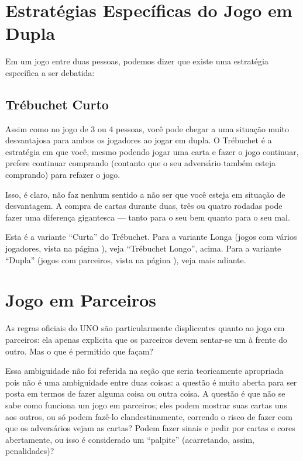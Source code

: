 \section{Estratégias Específicas do Jogo em Dupla}

Em um jogo entre duas pessoas, podemos dizer que existe uma estratégia específica a ser debatida:

\subsection{Trébuchet Curto}

\label{trebuchetcurto}

Assim como no jogo de 3 ou 4 pessoas, você pode chegar a uma situação muito desvantajosa para ambos os jogadores ao jogar em dupla. O Trébuchet é a estratégia em que você, mesmo podendo jogar uma carta e fazer o jogo continuar, prefere continuar comprando (contanto que o seu adversário também esteja comprando) para refazer o jogo.

Isso, é claro, não faz nenhum sentido a não ser que você esteja em situação de desvantagem. A compra de cartas durante duas, três ou quatro rodadas pode fazer uma diferença gigantesca --- tanto para o seu bem quanto para o seu mal.

Esta é a variante ``Curta'' do Trébuchet. Para a variante Longa (jogos com vários jogadores, vista na página \pageref{trebuchetlongo}), veja ``Trébuchet Longo'', acima. Para a variante ``Dupla'' (jogos com parceiros, vista na página \pageref{trebuchetduplo}), veja mais adiante.

\section{Jogo em Parceiros}

\label{jogoemparceiros}

As regras oficiais do UNO são particularmente displicentes quanto ao jogo em parceiros: ela apenas explicita que os parceiros devem sentar-se um à frente do outro. Mas o que é permitido que façam?

Essa ambiguidade não foi referida na seção que seria teoricamente apropriada pois não é uma ambiguidade entre duas coisas: a questão é muito aberta para ser posta em termos de fazer alguma coisa ou outra coisa. A questão é que não se sabe como funciona um jogo em parceiros; eles podem mostrar suas cartas uns aos outros, ou só podem fazê-lo clandestinamente, correndo o risco de fazer com que os adversários vejam as cartas? Podem fazer sinais e pedir por cartas e cores abertamente, ou isso é considerado um ``palpite'' (acarretando, assim, penalidades)?

